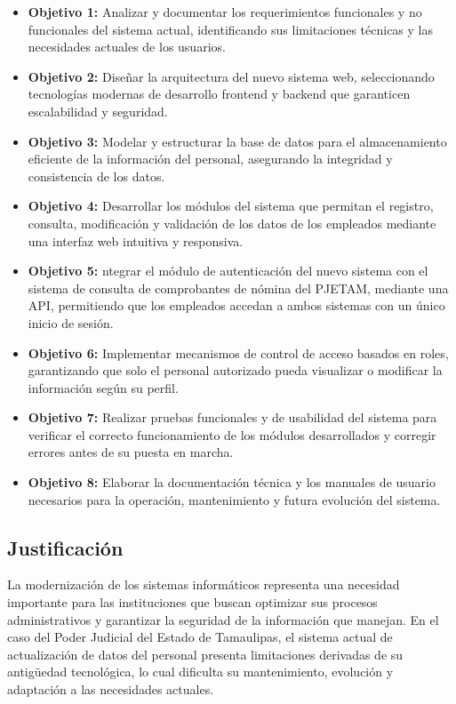 \begin{itemize}
    \item \textbf{Objetivo 1:} Analizar y documentar los requerimientos funcionales y no funcionales del sistema actual, identificando sus limitaciones técnicas y las necesidades actuales de los usuarios.
    \item \textbf{Objetivo 2:} Diseñar la arquitectura del nuevo sistema web, seleccionando tecnologías modernas de desarrollo frontend y backend que garanticen escalabilidad y seguridad.
    \item \textbf{Objetivo 3:} Modelar y estructurar la base de datos para el almacenamiento eficiente de la información del personal, asegurando la integridad y consistencia de los datos.
    \item \textbf{Objetivo 4:} Desarrollar los módulos del sistema que permitan el registro, consulta, modificación y validación de los datos de los empleados mediante una interfaz web intuitiva y responsiva.
    \item \textbf{Objetivo 5:} ntegrar el módulo de autenticación del nuevo sistema con el sistema de consulta de comprobantes de nómina del PJETAM, mediante una API, permitiendo que los empleados accedan a ambos sistemas con un único inicio de sesión.
    \item \textbf{Objetivo 6:} Implementar mecanismos de control de acceso basados en roles, garantizando que solo el personal autorizado pueda visualizar o modificar la información según su perfil.
    \item \textbf{Objetivo 7:} Realizar pruebas funcionales y de usabilidad del sistema para verificar el correcto funcionamiento de los módulos desarrollados y corregir errores antes de su puesta en marcha.
    \item \textbf{Objetivo 8:} Elaborar la documentación técnica y los manuales de usuario necesarios para la operación, mantenimiento y futura evolución del sistema.
\end{itemize}

\subsection{Justificación}
\label{sec:justificacion}

La modernización de los sistemas informáticos representa una necesidad importante para las instituciones que buscan optimizar sus procesos administrativos y garantizar la seguridad de la información que manejan. En el caso del Poder Judicial del Estado de Tamaulipas, el sistema actual de actualización de datos del personal presenta limitaciones derivadas de su antigüedad tecnológica, lo cual dificulta su mantenimiento, evolución y adaptación a las necesidades actuales.

